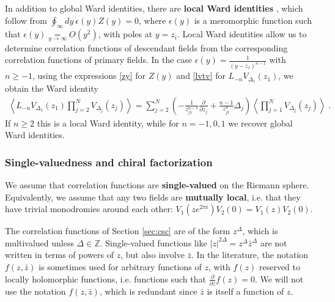 \documentclass[12pt, a4paper]{article}
\newcommand{\myindex}[1]{\textbf{\boldmath #1}}
\theoremstyle{break}
\begin{document}
In addition to global Ward identities, there are \myindex{local Ward identities} , which follow from $\oint_\infty dy\ \epsilon(y)Z(y)=0$, where $\epsilon(y)$ is a meromorphic function such that $\epsilon(y)\underset{y\to\infty}{=}O(y^2)$, with poles at $y=z_i$. Local Ward identities allow us to determine correlation functions of descendant fields from the corresponding correlation functions of primary fields. In the case $\epsilon(y) = \frac{1}{(y-z_1)^{n-1}}$ with $n\geq -1$, using the expressions \eqref{zy} for $Z(y)$ and \eqref{lvtv} for $L_{-n}V_{\Delta_1}(z_1)$, we obtain the Ward identity
\begin{align}
 \left<L_{-n}V_{\Delta_1}(z_1)\prod_{j=2}^N V_{\Delta_j}(z_j)\right> = \sum_{j=2}^N \left(-\frac{1}{z_{j1}^{n-1}}\frac{\partial}{\partial z_j} +\frac{n-1}{z_{j1}^n} \Delta_j\right) \left<\prod_{j=1}^N V_{\Delta_j}(z_j)\right>\ . 
 \label{lwi}
\end{align}
If $n\geq 2$ this is a local Ward identity, while for $n=-1,0,1$ we recover global Ward identities. 

\subsubsection{Single-valuedness and chiral factorization}

We assume that correlation functions are \myindex{single-valued} on the Riemann sphere. Equivalently, we assume that any two fields are \myindex{mutually local}, i.e. that they have trivial monodromies around each other: $V_1(ze^{2\pi i})V_2(0)=V_1(z)V_2(0)$. 

The correlation functions of Section \ref{sec:csc} are of the form $z^\Delta$, which is multivalued unless $\Delta\in\mathbb{Z}$. Single-valued functions like $|z|^{2\Delta}=z^\Delta\bar{z}^\Delta$ are not written in terms of powers of $z$, but also involve $\bar z$. In the literature, the notation $f(z,\bar z)$ is sometimes used for arbitrary functions of $z$, with $f(z)$ reserved to locally holomorphic functions, i.e. functions such that $\frac{\partial}{\partial \bar z} f(z) =0$. We will not use the notation $f(z,\bar z)$, which is redundant since $\bar z$ is itself a function of $z$. 
\end{document}
